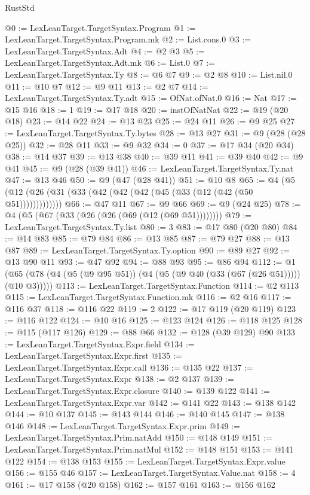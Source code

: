 \begin{lexlean}{RustStd}
\begin{coremodule}
@0 := LexLeanTarget.TargetSyntax.Program
@1 := LexLeanTarget.TargetSyntax.Program.mk
@2 := List.cons.{0}
@3 := LexLeanTarget.TargetSyntax.Adt
@4 := @2 @3
@5 := LexLeanTarget.TargetSyntax.Adt.mk
@6 := List.{0}
@7 := LexLeanTarget.TargetSyntax.Ty
@8 := @6 @7
@9 := @2 @8
@10 := List.nil.{0}
@11 := @10 @7
@12 := @9 @11
@13 := @2 @7
@14 := LexLeanTarget.TargetSyntax.Ty.adt
@15 := OfNat.ofNat.{0}
@16 := Nat
@17 := @15 @16
@18 := 1
@19 := @17 @18
@20 := instOfNatNat
@22 := @19 (@20 @18)
@23 := @14 @22
@24 := @13 @23
@25 := @24 @11
@26 := @9 @25
@27 := LexLeanTarget.TargetSyntax.Ty.bytes
@28 := @13 @27
@31 := @9 (@28 (@28 @25))
@32 := @28 @11
@33 := @9 @32
@34 := 0
@37 := @17 @34 (@20 @34)
@38 := @14 @37
@39 := @13 @38
@40 := @39 @11
@41 := @39 @40
@42 := @9 @41
@45 := @9 (@28 (@39 @41))
@46 := LexLeanTarget.TargetSyntax.Ty.nat
@47 := @13 @46
@50 := @9 (@47 (@28 @41))
@51 := @10 @8
@65 := @4 (@5 (@12 (@26 (@31 (@33 (@42 (@42 (@42 (@45 (@33 (@12 (@42 (@50 @51)))))))))))))
@66 := @47 @11
@67 := @9 @66
@69 := @9 (@24 @25)
@78 := @4 (@5 (@67 (@33 (@26 (@26 (@69 (@12 (@69 @51))))))))
@79 := LexLeanTarget.TargetSyntax.Ty.list
@80 := 3
@83 := @17 @80 (@20 @80)
@84 := @14 @83
@85 := @79 @84
@86 := @13 @85
@87 := @79 @27
@88 := @13 @87
@89 := LexLeanTarget.TargetSyntax.Ty.option
@90 := @89 @27
@92 := @13 @90 @11
@93 := @47 @92
@94 := @88 @93
@95 := @86 @94
@112 := @1 (@65 (@78 (@4 (@5 (@9 @95 @51)) (@4 (@5 (@9 @40 (@33 (@67 (@26 @51))))) (@10 @3)))))
@113 := LexLeanTarget.TargetSyntax.Function
@114 := @2 @113
@115 := LexLeanTarget.TargetSyntax.Function.mk
@116 := @2 @16
@117 := @116 @37
@118 := @116 @22
@119 := 2
@122 := @17 @119 (@20 @119)
@123 := @116 @122
@124 := @10 @16
@125 := @123 @124
@126 := @118 @125
@128 := @115 (@117 @126)
@129 := @88 @66
@132 := @128 (@39 @129) @90
@133 := LexLeanTarget.TargetSyntax.Expr.field
@134 := LexLeanTarget.TargetSyntax.Expr.first
@135 := LexLeanTarget.TargetSyntax.Expr.call
@136 := @135 @22
@137 := LexLeanTarget.TargetSyntax.Expr
@138 := @2 @137
@139 := LexLeanTarget.TargetSyntax.Expr.closure
@140 := @139 @122
@141 := LexLeanTarget.TargetSyntax.Expr.var
@142 := @141 @22
@143 := @138 @142
@144 := @10 @137
@145 := @143 @144
@146 := @140 @145
@147 := @138 @146
@148 := LexLeanTarget.TargetSyntax.Expr.prim
@149 := LexLeanTarget.TargetSyntax.Prim.natAdd
@150 := @148 @149
@151 := LexLeanTarget.TargetSyntax.Prim.natMul
@152 := @148 @151
@153 := @141 @122
@154 := @138 @153
@155 := LexLeanTarget.TargetSyntax.Expr.value
@156 := @155 @46
@157 := LexLeanTarget.TargetSyntax.Value.nat
@158 := 4
@161 := @17 @158 (@20 @158)
@162 := @157 @161
@163 := @156 @162

\end{coremodule}
\end{lexlean}

